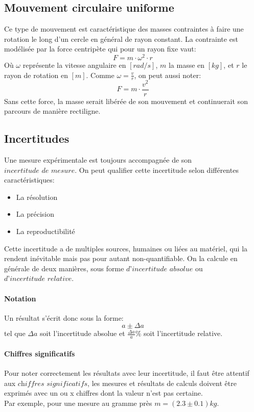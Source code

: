 \subsection{Mouvement circulaire uniforme}
Ce type de mouvement est caractéristique des masses contraintes à faire une rotation le long d'un cercle en général de rayon constant.
La contrainte est modélisée par la force centripète qui pour un rayon fixe vaut:
\begin{equation}
    \label{force}
    F=m\cdot \omega^2 \cdot r
\end{equation}
Où $\omega$ représente la vitesse angulaire en $[rad/s]$, $m$ la masse en $[kg]$, et $r$ le rayon de rotation en $[m]$.
Comme $\omega=\frac{v}{r}$, on peut aussi noter:
\begin{equation}
    F=m\cdot\frac{v^2}{r}
\end{equation}
Sans cette force, la masse serait libérée de son mouvement et continuerait son parcours de manière rectiligne.

\subsection{Incertitudes}

Une mesure expérimentale est toujours accompagnée de son $\textit{incertitude de mesure}$. On peut qualifier cette incertitude selon différentes caractéristiques:
\begin{itemize}
\item La résolution
\item La précision
\item La reproductibilité
\end{itemize}

Cette incertitude a de multiples sources, humaines ou liées au matériel, qui la rendent inévitable mais pas pour autant non-quantifiable.
On la calcule en générale de deux manières, sous forme $\textit{d'incertitude absolue}$ ou $\textit{d'incertitude relative}$.

\paragraph{Notation}
Un résultat s'écrit donc sous la forme: \[a\pm\Delta a\] tel que $\Delta a$ soit l'incertitude absolue et $\frac{\Delta a}{a} \%$ soit l'incertitude relative.

\paragraph{Chiffres significatifs}
Pour noter correctement les résultats avec leur incertitude, il faut être attentif aux $\textit{chiffres significatifs}$, les mesures et résultats de calculs doivent être exprimés avec un ou x chiffres dont la valeur n'est pas certaine.\\
Par exemple, pour une mesure au gramme près $m = (2.3\pm0.1)kg$.

